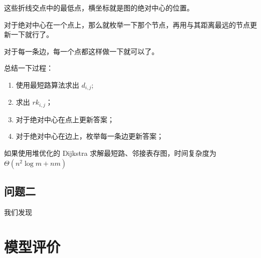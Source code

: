 \documentclass{cumcmthesis}
\begin{document}
这些折线交点中的最低点，横坐标就是图的绝对中心的位置。

对于绝对中心在一个点上，那么就枚举一下那个节点，再用与其距离最远的节点更新一下就行了。

对于每一条边，每一个点都这样做一下就可以了。

总结一下过程：

\begin{enumerate}
    \item 使用最短路算法求出 $d_{i,j}$;
    \item 求出 $rk_{i,j}$；
    \item 对于绝对中心在点上更新答案；
    \item 对于绝对中心在边上，枚举每一条边更新答案；
\end{enumerate}

如果使用堆优化的 Dijkstra 求解最短路、邻接表存图，时间复杂度为 $\Theta(n^2\log m + nm)$

\subsection{问题二}

我们发现

\section{模型评价}




\newpage

\begin{appendices}


\end{appendices}
\end{document}
